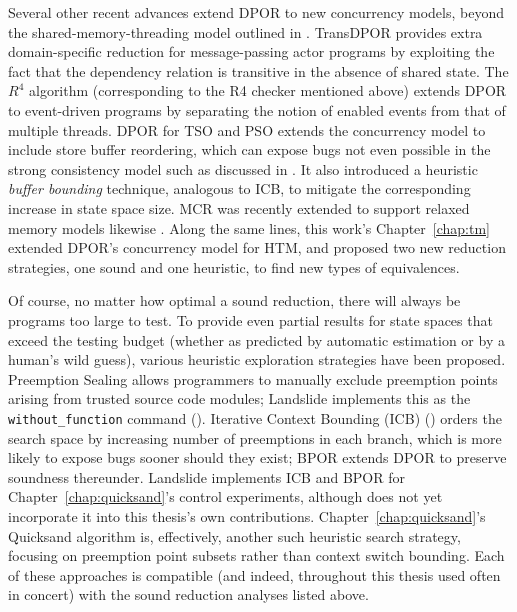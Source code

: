 Several other recent advances extend DPOR to new concurrency models,
beyond the shared-memory-threading model outlined in \sect{\ref{sec:landslide-dpor}}.
TransDPOR \cite{transdpor} provides extra domain-specific reduction for message-passing actor programs
by exploiting the fact that the dependency relation is transitive in the absence of shared state.
The $R^4$ algorithm \cite{r4} (corresponding to the R4 checker mentioned above)
extends DPOR to event-driven programs by separating the notion of enabled events from that of multiple threads.
DPOR for TSO and PSO \cite{tsopso}
extends the concurrency model to include store buffer reordering,
which can expose bugs not even possible in the strong consistency model
such as discussed in \sect{\ref{sec:tm-warpzone-relaxed}}.
It also introduced a heuristic {\em buffer bounding} technique, analogous to ICB,
to mitigate the corresponding increase in state space size.
MCR was recently extended to support relaxed memory models likewise \cite{mcr-tsopso}.
Along the same lines, this work's Chapter~\ref{chap:tm}
extended DPOR's concurrency model for HTM,
and proposed two new reduction strategies, one sound and one heuristic,
to find new types of equivalences.

Of course, no matter how optimal a sound reduction, there will always be programs too large to test.
To provide even partial results for state spaces that exceed the testing budget
(whether as predicted by automatic estimation \cite{estimation} or by a human's wild guess),
various heuristic exploration strategies have been proposed.
Preemption Sealing \cite{sealing} allows programmers to manually exclude preemption points
arising from trusted source code modules;
Landslide implements this as the {\tt without\_function} command (\sect{\ref{sec:landslide-pps}}).
Iterative Context Bounding (ICB) \cite{chess-icb} (\sect{\ref{sec:landslide-icb}})
orders the search space by increasing number of preemptions in each branch,
which is more likely to expose bugs sooner should they exist;
BPOR \cite{bpor} extends DPOR to preserve soundness
thereunder. %
Landslide implements ICB and BPOR for Chapter~\ref{chap:quicksand}'s control experiments,
although does not yet incorporate it into this thesis's own contributions.
Chapter~\ref{chap:quicksand}'s Quicksand algorithm is, effectively, another such heuristic search strategy,
focusing on preemption point subsets rather than context switch bounding.
Each of these approaches is compatible (and indeed, throughout this thesis used often in concert)
with the sound reduction analyses listed above.

